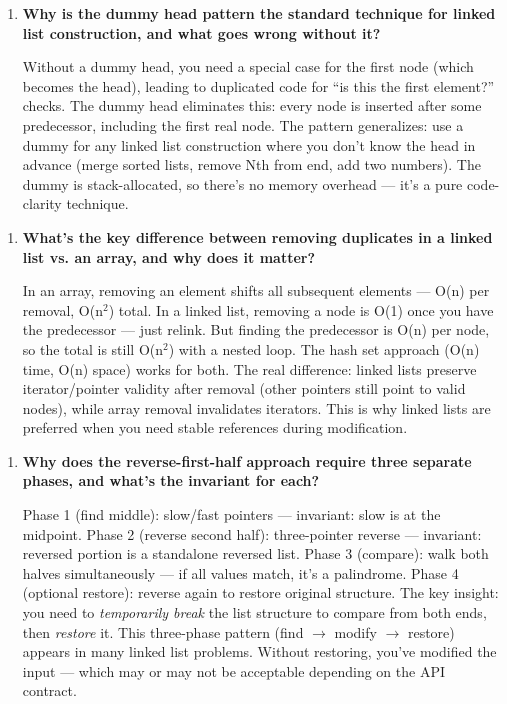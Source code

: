 \begin{enumerate}
\item \textbf{Why is the dummy head pattern the standard technique for linked list construction, and what goes wrong without it?}

Without a dummy head, you need a special case for the first node (which becomes the head), leading to duplicated code for ``is this the first element?'' checks. The dummy head eliminates this: every node is inserted after some predecessor, including the first real node. The pattern generalizes: use a dummy for any linked list construction where you don't know the head in advance (merge sorted lists, remove Nth from end, add two numbers). The dummy is stack-allocated, so there's no memory overhead — it's a pure code-clarity technique.
\end{enumerate}

\begin{enumerate}
\item \textbf{What's the key difference between removing duplicates in a linked list vs. an array, and why does it matter?}

In an array, removing an element shifts all subsequent elements — O(n) per removal, O(n$^{2}$) total. In a linked list, removing a node is O(1) once you have the predecessor — just relink. But finding the predecessor is O(n) per node, so the total is still O(n$^{2}$) with a nested loop. The hash set approach (O(n) time, O(n) space) works for both. The real difference: linked lists preserve iterator/pointer validity after removal (other pointers still point to valid nodes), while array removal invalidates iterators. This is why linked lists are preferred when you need stable references during modification.
\end{enumerate}

\begin{enumerate}
\item \textbf{Why does the reverse-first-half approach require three separate phases, and what's the invariant for each?}

Phase 1 (find middle): slow/fast pointers — invariant: slow is at the midpoint. Phase 2 (reverse second half): three-pointer reverse — invariant: reversed portion is a standalone reversed list. Phase 3 (compare): walk both halves simultaneously — if all values match, it's a palindrome. Phase 4 (optional restore): reverse again to restore original structure. The key insight: you need to \textit{temporarily break} the list structure to compare from both ends, then \textit{restore} it. This three-phase pattern (find $\to$ modify $\to$ restore) appears in many linked list problems. Without restoring, you've modified the input — which may or may not be acceptable depending on the API contract.
\end{enumerate}

